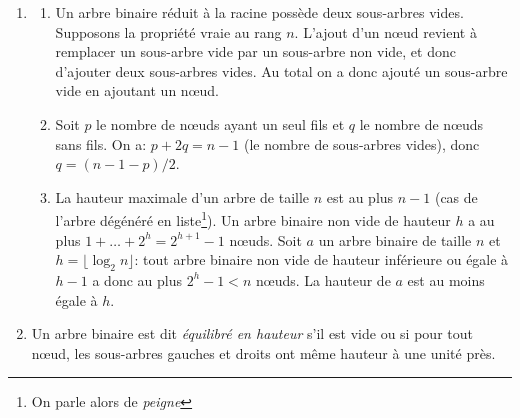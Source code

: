 \begin{enumerate}
  \item
    \begin{enumerate}

      \item Un arbre binaire réduit à la racine possède deux
        sous-arbres vides. Supposons la propriété vraie au rang
        \(n\). L'ajout d'un n{\oe}ud revient à remplacer un sous-arbre
        vide par un sous-arbre non vide, et donc d'ajouter deux
        sous-arbres vides. Au total on a donc ajouté un sous-arbre
        vide en ajoutant un n{\oe}ud.

      \item Soit \(p\) le nombre de n{\oe}uds ayant un seul fils et
        \(q\) le nombre de n{\oe}uds sans fils. On a: \(p + 2q = n -
        1\) (le nombre de sous-arbres vides), donc \(q = (n-1-p)/2\).

      \item La hauteur maximale d'un arbre de taille \(n\) est au plus
        \(n-1\) (cas de l'arbre dégénéré en liste\footnote{On parle
          alors de \emph{peigne}}). Un arbre binaire non vide de
        hauteur \(h\) a au plus \(1 + \ldots + 2^{h} = 2^{h+1} - 1\)
        n{\oe}uds. Soit \(a\) un arbre binaire de taille \(n\) et
        \(h=\lfloor\log_2{n}\rfloor\): tout arbre binaire non vide de
        hauteur inférieure ou égale à \(h-1\) a donc au plus \(2^{h} -
        1 < n\) n{\oe}uds. La hauteur de \(a\) est au moins égale à
        \(h\).

    \end{enumerate}

    \item Un arbre binaire est dit \emph{équilibré en hauteur} s'il
      est vide ou si pour tout n{\oe}ud, les sous-arbres gauches et
      droits ont même hauteur à une unité près.


\end{enumerate}
